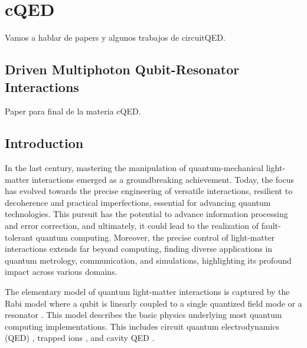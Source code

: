 \chapter{cQED}
\label{ch5_cqed}

\newcommand{\bop}{\hat{b}}
\newcommand{\bdag}{\hat{b}^\dagger}
\newcommand{\bdagT}{\hat{b}^{\dagger 2}}
\newcommand{\aop}{\hat{a}}
\newcommand{\adag}{\hat{a}^\dagger}
\newcommand{\adagT}{\hat{a}^{\dagger 2}}
\newcommand{\adagTh}{\hat{a}^{\dagger 3}}
\newcommand{\adagn}{\hat{a}^{\dagger n}}
\newcommand{\sigP}{\hat{\sigma}_+}
\newcommand{\sigM}{\hat{\sigma}_-}
\newcommand{\sigZ}{\hat{\sigma}_z}
\newcommand{\sigX}{\hat{\sigma}_x}
\newcommand{\sigY}{\hat{\sigma}_y}

\pagestyle{fancy}
\fancyhf{}
\fancyhead[LE]{\nouppercase{\rightmark\hfill}}
\fancyhead[RO]{\nouppercase{\leftmark\hfill}}
\fancyfoot[LE,RO]{\hfill\thepage\hfill}

Vamos a hablar de papers y algunos trabajos de circuitQED.

\section{Driven Multiphoton Qubit-Resonator Interactions}
Paper para final de la materia cQED.
\section{Introduction}
In the last century, mastering the manipulation of quantum-mechanical light-matter interactions emerged as a groundbreaking achievement. Today, the focus has evolved towards the precise engineering of versatile interactions, resilient to decoherence and practical imperfections, essential for advancing quantum technologies. This pursuit has the potential to advance information processing and error correction, and ultimately, it could lead to the realization of fault-tolerant quantum computing. Moreover, the precise control of light-matter interactions extends far beyond computing, finding diverse applications in quantum metrology, communication, and simulations, highlighting its profound impact across various domains.

The elementary model of quantum light-matter interactions is captured by the Rabi model where a qubit is linearly coupled to a single quantized field mode or a resonator \cite{}. This model describes the basic physics underlying most quantum computing implementations. This includes circuit quantum electrodynamics (QED) \cite{}, trapped ions \cite{}, and cavity QED \cite{}.


